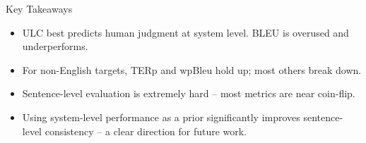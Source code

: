 \begin{frame}{Key Takeaways}

\begin{itemize}
    \item ULC best predicts human judgment at system level. BLEU is overused and underperforms.
    \item For non-English targets, TERp and wpBleu hold up; most others break down.
    \item Sentence-level evaluation is extremely hard -- most metrics are near coin-flip.
    \item Using system-level performance as a prior significantly improves sentence-level consistency -- a clear direction for future work.
\end{itemize}

\end{frame}
